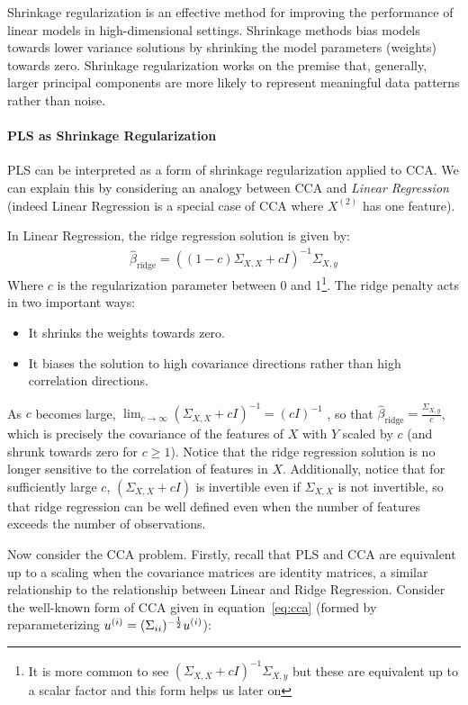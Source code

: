 Shrinkage regularization is an effective method for improving the performance of linear models in high-dimensional settings.
Shrinkage methods bias models towards lower variance solutions by shrinking the model parameters (weights) towards zero.
Shrinkage regularization works on the premise that, generally, larger principal components are more likely to represent meaningful data patterns rather than noise.

\paragraph{PLS as Shrinkage Regularization}

PLS can be interpreted as a form of shrinkage regularization applied to CCA. We can explain this by considering an analogy between CCA and \textit{Linear Regression} (indeed Linear Regression is a special case of CCA where \(X^{(2)}\) has one feature).

In Linear Regression, the ridge regression solution is given by:
\begin{align}
    \hat{\beta}_{\text{ridge}} = ((1-c)\Sigma_{X,X} + c I)^{-1} \Sigma_{X,y}
\end{align}
Where \(c\) is the regularization parameter between 0 and 1\footnote{It is more common to see $(\Sigma_{X,X} + c I)^{-1} \Sigma_{X,y}$ but these are equivalent up to a scalar factor and this form helps us later on}.
The ridge penalty acts in two important ways:
\begin{itemize}
    \item It shrinks the \gls{weights} towards zero.
    \item It biases the solution to high covariance directions rather than high correlation directions.
\end{itemize}

As $c$ becomes large, $\lim_{c \to \infty} (\Sigma_{X,X} + c I)^{-1} = (c I)^{-1}$
, so that $\hat{\beta}_{\text{ridge}}=\frac{\Sigma_{X,y}}{c}$, which is precisely the covariance of the features of $X$ with $Y$ scaled by $c$ (and shrunk towards zero for $c \geq 1$).
Notice that the ridge regression solution is no longer sensitive to the correlation of features in $X$.
Additionally, notice that for sufficiently large $c$, $(\Sigma_{X,X} + c I)$ is invertible even if $\Sigma_{X,X}$ is not invertible, so that ridge regression can be well defined even when the number of features exceeds the number of observations.

Now consider the CCA problem.
Firstly, recall that PLS and CCA are equivalent up to a scaling when the covariance matrices are identity matrices, a similar relationship to the relationship between Linear and Ridge Regression.
Consider the well-known form of CCA given in equation~\ref{eq:cca}\citep{mihalik2022canonical} (formed by reparameterizing \(u^{(i)}=(\Sigma_{ii})^{-\frac{1}{2}}u^{(i)}\)):

